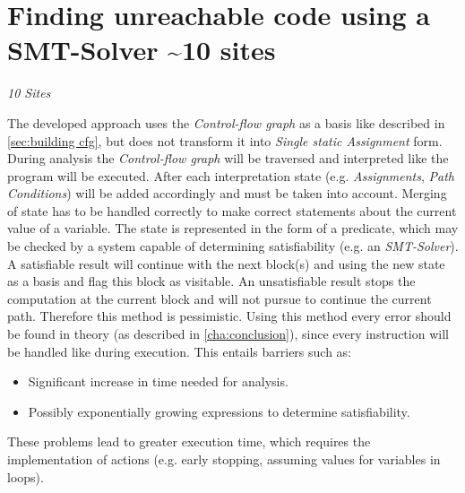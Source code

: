 
\chapter{Finding unreachable code using a SMT-Solver \textasciitilde 10 sites}
\label{cha:finding unreachable code using a smt-solver}
\emph{10 Sites}

The developed approach uses the \emph{Control-flow graph} as a basis like described in \ref{sec:building cfg}, but does not transform it into \emph{Single static Assignment} form.
During analysis the \emph{Control-flow graph} will be traversed and interpreted like the program will be executed.
After each interpretation state (e.g. \emph{Assignments}, \emph{Path Conditions}) will be added accordingly and must be taken into account.
Merging of state has to be handled correctly to make correct statements about the current value of a variable.
The state is represented in the form of a predicate, which may be checked by a system capable of determining satisfiability (e.g. an \emph{SMT-Solver}).
A satisfiable result will continue with the next block(s) and using the new state as a basis and flag this block as visitable.
An unsatisfiable result stops the computation at the current block and will not pursue to continue the current path.
Therefore this method is pessimistic.
Using this method every error should be found in theory (as described in \ref{cha:conclusion}), since every instruction will be handled like during execution. 
This entails barriers such as: 
\begin{itemize}
	\item Significant increase in time needed for analysis. 
	\item Possibly exponentially growing expressions to determine satisfiability.
\end{itemize}
These problems lead to greater execution time, which requires the implementation of actions (e.g. early stopping, assuming values for variables in loops).


